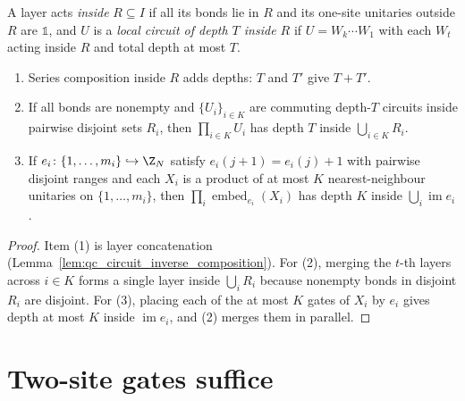 \begin{lemma}
    \label{lem:qc_parallel_circuits}
    \leanok
    A layer acts \emph{inside} $R\subseteq I$ if all its bonds lie in $R$ and its one-site unitaries outside $R$ are $\mathbb 1$, and $U$ is a \emph{local circuit of depth $T$ inside $R$} if $U=W_k\cdots W_1$ with each $W_t$ acting inside $R$ and total depth at most $T$.
    \begin{enumerate}
        \item Series composition inside $R$ adds depths: $T$ and $T'$ give $T+T'$.
        \item If all bonds are nonempty and $\{U_i\}_{i\in K}$ are commuting depth-$T$ circuits inside pairwise disjoint sets $R_i$, then $\prod_{i\in K}U_i$ has depth $T$ inside $\bigcup_{i\in K}R_i$.
        \item If $e_i\colon\{1,\dots,m_i\}\hookrightarrow\Z_N$ satisfy $e_i(j+1)=e_i(j)+1$ with pairwise disjoint ranges and each $X_i$ is a product of at most $K$ nearest-neighbour unitaries on $\{1,\dots,m_i\}$, then $\prod_i\operatorname{embed}_{e_i}(X_i)$ has depth $K$ inside $\bigcup_i\operatorname{im}e_i$.
    \end{enumerate}
\end{lemma}
\begin{proof}
    \leanok
    Item (1) is layer concatenation (Lemma~\ref{lem:qc_circuit_inverse_composition}). For (2), merging the $t$-th layers across $i\in K$ forms a single layer inside $\bigcup_i R_i$ because nonempty bonds in disjoint $R_i$ are disjoint. For (3), placing each of the at most $K$ gates of $X_i$ by $e_i$ gives depth at most $K$ inside $\operatorname{im}e_i$, and (2) merges them in parallel.
\end{proof}

\section{Two-site gates suffice}
\label{sec:qc_two_site_gates}

